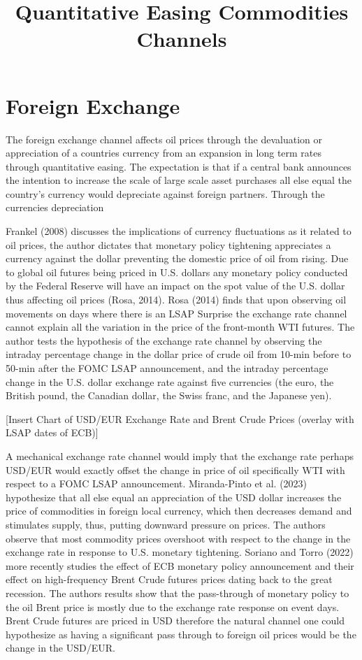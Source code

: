 
\title{Quantitative Easing Commodities Channels}
\section{Foreign Exchange}
The foreign exchange channel affects oil prices through the devaluation or appreciation of a countries currency from an expansion in long term rates through quantitative easing. The expectation is that if a central bank announces the intention to increase the scale of large scale asset purchases all else equal the country's currency would depreciate against foreign partners. Through the currencies depreciation 

Frankel (2008) discusses the implications of currency fluctuations as it related to oil prices, the author dictates that monetary policy tightening appreciates a currency against the dollar preventing the domestic price of oil from rising. Due to global oil futures being priced in U.S. dollars any monetary policy conducted by the Federal Reserve will have an impact on the spot value of the U.S. dollar thus affecting oil prices (Rosa, 2014). Rosa (2014) finds that upon observing oil movements on days where there is an LSAP Surprise the exchange rate channel cannot explain all the variation in the price of the front-month WTI futures. The author tests the hypothesis of the exchange rate channel by observing the intraday percentage change in the dollar price of crude oil from 10-min before to 50-min after the FOMC LSAP announcement, and the intraday percentage change in the U.S. dollar exchange rate against five currencies (the euro, the British pound, the Canadian dollar, the Swiss franc, and the Japanese yen). 

[Insert Chart of USD/EUR Exchange Rate and Brent Crude Prices (overlay with LSAP dates of ECB)]

A mechanical exchange rate channel would imply that the exchange rate perhaps USD/EUR would exactly offset the change in price of oil specifically WTI with respect to a FOMC LSAP announcement. Miranda-Pinto et al. (2023) hypothesize that all else equal an appreciation of the USD dollar increases the price of commodities in foreign local currency, which then decreases demand and stimulates supply, thus, putting downward pressure on prices. The authors observe that most commodity prices overshoot with respect to the change in the exchange rate in response to U.S. monetary tightening. Soriano and Torro (2022) more recently studies the effect of ECB monetary policy announcement and their effect on high-frequency Brent Crude futures prices dating back to the great recession. The authors results show that the pass-through of monetary policy to the oil Brent price is mostly due to the exchange rate response on event days. Brent Crude futures are priced in USD therefore the natural channel one could hypothesize as having a significant pass through to foreign oil prices would be the change in the USD/EUR. 

